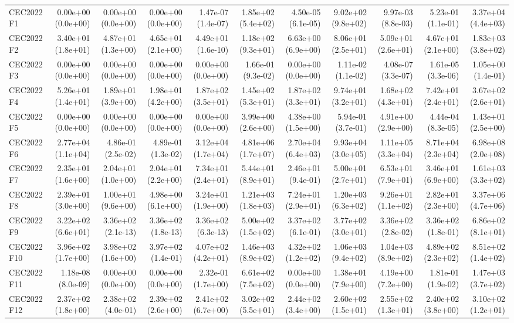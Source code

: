 \begin{longtable}{lrrrrrrrrrr}
CEC2022 F1 & 0.00e+00 (0.0e+00) & 0.00e+00 (0.0e+00) & 0.00e+00 (0.0e+00) & 1.47e-07 (1.4e-07) & 1.85e+02 (5.4e+02) & 4.50e-05 (6.1e-05) & 9.02e+02 (9.8e+02) & 9.97e-03 (8.8e-03) & 5.23e-01 (1.1e-01) & 3.37e+04 (4.4e+03) \\
CEC2022 F2 & 3.40e+01 (1.8e+01) & 4.87e+01 (1.3e+00) & 4.65e+01 (2.1e+00) & 4.49e+01 (1.6e-10) & 1.18e+02 (9.3e+01) & 6.63e+00 (6.9e+00) & 8.06e+01 (2.5e+01) & 5.09e+01 (2.6e+01) & 4.67e+01 (2.1e+00) & 1.83e+03 (3.8e+02) \\
CEC2022 F3 & 0.00e+00 (0.0e+00) & 0.00e+00 (0.0e+00) & 0.00e+00 (0.0e+00) & 0.00e+00 (0.0e+00) & 1.66e-01 (9.3e-02) & 0.00e+00 (0.0e+00) & 1.11e-02 (1.1e-02) & 4.08e-07 (3.3e-07) & 1.61e-05 (3.3e-06) & 1.05e+00 (1.4e-01) \\
CEC2022 F4 & 5.26e+01 (1.4e+01) & 1.89e+01 (3.9e+00) & 1.98e+01 (4.2e+00) & 1.87e+02 (3.5e+01) & 1.45e+02 (5.3e+01) & 1.87e+02 (3.3e+01) & 9.74e+01 (3.2e+01) & 1.68e+02 (4.3e+01) & 7.42e+01 (2.4e+01) & 3.67e+02 (2.6e+01) \\
CEC2022 F5 & 0.00e+00 (0.0e+00) & 0.00e+00 (0.0e+00) & 0.00e+00 (0.0e+00) & 0.00e+00 (0.0e+00) & 3.99e+00 (2.6e+00) & 4.38e+00 (1.5e+00) & 5.94e-01 (3.7e-01) & 4.91e+00 (2.9e+00) & 4.44e-04 (8.3e-05) & 1.43e+01 (2.5e+00) \\
CEC2022 F6 & 2.77e+04 (1.1e+04) & 4.86e-01 (2.5e-02) & 4.89e-01 (1.3e-02) & 3.12e+04 (1.7e+04) & 4.81e+06 (1.7e+07) & 2.70e+04 (6.4e+03) & 9.93e+04 (3.0e+05) & 1.11e+05 (3.3e+04) & 8.71e+04 (2.3e+04) & 6.98e+08 (2.0e+08) \\
CEC2022 F7 & 2.35e+01 (1.6e+00) & 2.04e+01 (1.0e+00) & 2.04e+01 (2.2e+00) & 7.34e+01 (2.4e+01) & 5.44e+01 (8.9e+01) & 2.46e+01 (9.4e-01) & 5.00e+01 (2.7e+01) & 6.53e+01 (7.9e+01) & 3.46e+01 (6.9e+00) & 1.61e+03 (3.3e+02) \\
CEC2022 F8 & 2.39e+01 (3.0e+00) & 1.00e+01 (9.6e+00) & 4.98e+00 (6.1e+00) & 3.24e+01 (1.9e+00) & 1.21e+03 (1.8e+03) & 7.24e+01 (2.9e+01) & 1.20e+03 (6.3e+02) & 9.26e+01 (1.1e+02) & 2.82e+01 (2.3e+00) & 3.37e+06 (4.7e+06) \\
CEC2022 F9 & 3.22e+02 (6.6e+01) & 3.36e+02 (2.1e-13) & 3.36e+02 (1.8e-13) & 3.36e+02 (6.3e-13) & 5.00e+02 (1.5e+02) & 3.37e+02 (6.1e-01) & 3.77e+02 (3.0e+01) & 3.36e+02 (2.8e-02) & 3.36e+02 (1.8e-01) & 6.86e+02 (8.1e+01) \\
CEC2022 F10 & 3.96e+02 (1.7e+00) & 3.98e+02 (1.6e+00) & 3.97e+02 (1.4e-01) & 4.07e+02 (4.2e+01) & 1.46e+03 (8.9e+02) & 4.32e+02 (1.2e+02) & 1.06e+03 (9.4e+02) & 1.04e+03 (8.9e+02) & 4.89e+02 (2.3e+02) & 8.51e+02 (1.4e+02) \\
CEC2022 F11 & 1.18e-08 (8.0e-09) & 0.00e+00 (0.0e+00) & 0.00e+00 (0.0e+00) & 2.32e-01 (1.7e+00) & 6.61e+02 (7.5e+02) & 0.00e+00 (0.0e+00) & 1.38e+01 (7.9e+00) & 4.19e+00 (7.2e+00) & 1.81e-01 (1.9e-02) & 1.47e+03 (3.7e+02) \\
CEC2022 F12 & 2.37e+02 (1.8e+00) & 2.38e+02 (4.0e-01) & 2.39e+02 (2.6e+00) & 2.41e+02 (6.7e+00) & 3.02e+02 (5.5e+01) & 2.44e+02 (3.4e+00) & 2.60e+02 (1.5e+01) & 2.55e+02 (1.3e+01) & 2.40e+02 (3.8e+00) & 3.10e+02 (1.2e+01) \\
\bottomrule
\end{longtable}
